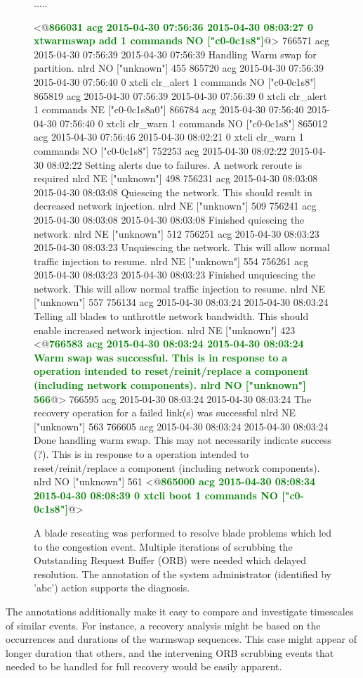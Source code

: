 \begin{figure*}
\begin{annol}
.....

<@\textbf{\textcolor{green}{866031	acg	2015-04-30 07:56:36	2015-04-30 08:03:27	0	xtwarmswap add	1	commands	NO	["c0-0c1s8"]}}@>
766571	acg	2015-04-30 07:56:39	2015-04-30 07:56:39		Handling Warm swap for partition.	nlrd	NO	["unknown"]	455
865720	acg	2015-04-30 07:56:39	2015-04-30 07:56:40	0	xtcli clr_alert	1	commands	NO	["c0-0c1s8"]
865819	acg	2015-04-30 07:56:39	2015-04-30 07:56:39	0	xtcli clr_alert	1	commands	NE	["c0-0c1s8a0"]
866784	acg	2015-04-30 07:56:40	2015-04-30 07:56:40	0	xtcli clr_warn	1	commands	NO	["c0-0c1s8"]
865012	acg	2015-04-30 07:56:46	2015-04-30 08:02:21	0	xtcli clr_warn	1	commands	NO	["c0-0c1s8"]
752253	acg	2015-04-30 08:02:22	2015-04-30 08:02:22		Setting alerts due to failures. A network reroute is required	nlrd	NE	["unknown"]	498
756231	acg	2015-04-30 08:03:08	2015-04-30 08:03:08		Quiescing the network. This should result in decreased network injection.	nlrd	NE	["unknown"]	509
756241	acg	2015-04-30 08:03:08	2015-04-30 08:03:08		Finished quiescing the network. 	nlrd	NE	["unknown"]	512
756251	acg	2015-04-30 08:03:23	2015-04-30 08:03:23		Unquiescing the network. This will allow normal traffic injection to resume.	nlrd	NE	["unknown"]	554
756261	acg	2015-04-30 08:03:23	2015-04-30 08:03:23		Finished unquiescing the network. This will allow normal traffic injection to resume.	nlrd	NE	["unknown"]	557
756134	acg	2015-04-30 08:03:24	2015-04-30 08:03:24		Telling all blades to unthrottle network bandwidth. This should enable increased network injection.	nlrd	NE	["unknown"]	423
<@\textbf{\textcolor{green}{766583	acg	2015-04-30 08:03:24	2015-04-30 08:03:24		Warm swap was successful. This is in response to a operation intended to reset/reinit/replace a component (including network components).	nlrd	NO	["unknown"]	566}}@>
766595	acg	2015-04-30 08:03:24	2015-04-30 08:03:24		The recovery operation for a failed link(s) was successful	nlrd	NE	["unknown"]	563
766605	acg	2015-04-30 08:03:24	2015-04-30 08:03:24		Done handling warm swap. This may not necessarily indicate success (?). This is in response to a operation intended to reset/reinit/replace a component (including network components).		nlrd	NO	["unknown"]	561
<@\textbf{\textcolor{green}{865000	acg	2015-04-30 08:08:34	2015-04-30 08:08:39	0	xtcli boot	1	commands	NO	["c0-0c1s8"]}}@>
\end{annol}
\caption{A blade reseating was performed to resolve blade problems which led to the congestion event.
Multiple iterations of scrubbing the Outstanding Request Buffer (ORB) were needed which
delayed resolution. The annotation of the system administrator (identified by 'abc') action supports the diagnosis.
}
\label{f:congestresolve}
\end{figure*}


The annotations additionally make it easy to compare and investigate timescales of similar events. For instance,
a recovery analysis might be based on the occurrences and durations of the warmswap sequences. This case
might appear of longer duration that others, and the intervening ORB scrubbing events that
needed to be handled for full recovery would be easily apparent.

